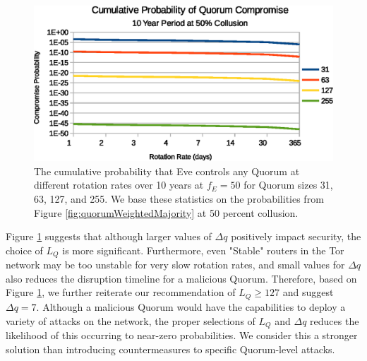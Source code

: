 \documentclass[USenglish,oneside,twocolumn]{article}
\begin{document}
\begin{figure}[h]
	\centering
	\includegraphics[width=\linewidth]{../assets/analysis/CumulativeMaliciousQuorumNew.eps}
	\caption{The cumulative probability that Eve controls any Quorum at different rotation rates over 10 years at $ f_{E} = 50 $ for Quorum sizes 31, 63, 127, and 255. We base these statistics on the probabilities from Figure \ref{fig:quorumWeightedMajority} at 50 percent collusion.}
	\label{fig:cumulativeProbability}
\end{figure}

Figure \ref{fig:cumulativeProbability} suggests that although larger values of $ \Delta q $ positively impact security, the choice of $ L_{Q} $ is more significant. Furthermore, even "Stable" routers in the Tor network may be too unstable for very slow rotation rates, and small values for $ \Delta q $ also reduces the disruption timeline for a malicious Quorum. Therefore, based on Figure \ref{fig:cumulativeProbability}, we further reiterate our recommendation of $ L_{Q} \geq 127 $ and suggest $ \Delta q = 7 $. Although a malicious Quorum would have the capabilities to deploy a variety of attacks on the network, the proper selections of $ L_{Q} $ and $ \Delta q $ reduces the likelihood of this occurring to near-zero probabilities. We consider this a stronger solution than introducing countermeasures to specific Quorum-level attacks.

 


\end{document}
